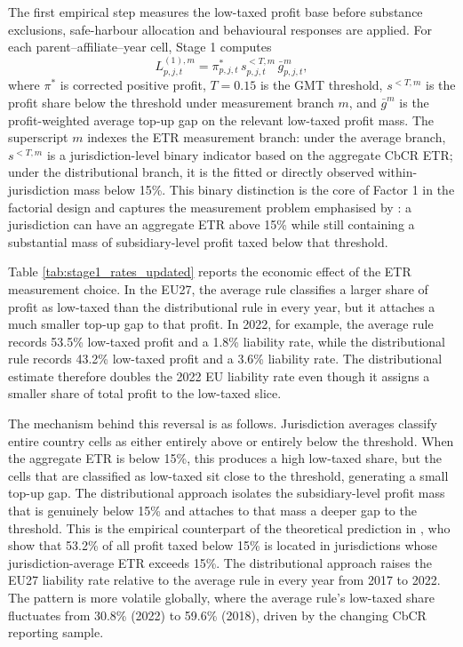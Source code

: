 \documentclass[11pt,a4paper]{article}
\begin{document}
The first empirical step measures the low-taxed profit base before substance exclusions, safe-harbour allocation and behavioural responses are applied. For each parent--affiliate--year cell, Stage 1 computes
\begin{equation}\label{eq:results_stage1_liability}
L_{p,j,t}^{(1),m}
= \pi_{p,j,t}^{*}\, s_{p,j,t}^{<T,m}\, \bar{g}_{p,j,t}^{m},
\end{equation}
where $\pi^{*}$ is corrected positive profit, $T=0.15$ is the GMT threshold, $s^{<T,m}$ is the profit share below the threshold under measurement branch $m$, and $\bar{g}^{m}$ is the profit-weighted average top-up gap on the relevant low-taxed profit mass. The superscript $m$ indexes the ETR measurement branch: under the average branch, $s^{<T,m}$ is a jurisdiction-level binary indicator based on the aggregate CbCR ETR; under the distributional branch, it is the fitted or directly observed within-jurisdiction mass below 15\%. This binary distinction is the core of Factor 1 in the factorial design and captures the measurement problem emphasised by \citet{hugger2026}: a jurisdiction can have an aggregate ETR above 15\% while still containing a substantial mass of subsidiary-level profit taxed below that threshold.



Table \ref{tab:stage1_rates_updated} reports the economic effect of the ETR measurement choice. In the EU27, the average rule classifies a larger share of profit as low-taxed than the distributional rule in every year, but it attaches a much smaller top-up gap to that profit. In 2022, for example, the average rule records 53.5\% low-taxed profit and a 1.8\% liability rate, while the distributional rule records 43.2\% low-taxed profit and a 3.6\% liability rate. The distributional estimate therefore doubles the 2022 EU liability rate even though it assigns a smaller share of total profit to the low-taxed slice.

The mechanism behind this reversal is as follows. Jurisdiction averages classify entire country cells as either entirely above or entirely below the threshold. When the aggregate ETR is below 15\%, this produces a high low-taxed share, but the cells that are classified as low-taxed sit close to the threshold, generating a small top-up gap. The distributional approach isolates the subsidiary-level profit mass that is genuinely below 15\% and attaches to that mass a deeper gap to the threshold. This is the empirical counterpart of the theoretical prediction in \citet{hugger2026}, who show that 53.2\% of all profit taxed below 15\% is located in jurisdictions whose jurisdiction-average ETR exceeds 15\%. The distributional approach raises the EU27 liability rate relative to the average rule in every year from 2017 to 2022. The pattern is more volatile globally, where the average rule's low-taxed share fluctuates from 30.8\% (2022) to 59.6\% (2018), driven by the changing CbCR reporting sample.
\end{document}
